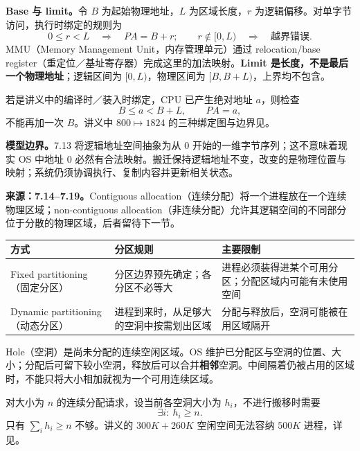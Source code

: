 \textbf{Base 与 limit。}令 $B$ 为起始物理地址，$L$ 为区域长度，$r$ 为逻辑偏移。对单字节访问，执行时绑定的规则为
\[
  0\le r<L\quad\Longrightarrow\quad PA=B+r;
  \qquad r\notin[0,L)\quad\Longrightarrow\quad\text{越界错误}.
\]
MMU（Memory Management Unit，内存管理单元）通过 relocation/base register（重定位／基址寄存器）完成这里的加法映射。\textbf{Limit 是长度，不是最后一个物理地址}；逻辑区间为 $[0,L)$，物理区间为 $[B,B+L)$，上界均不包含。

若是讲义中的编译时／装入时绑定，CPU 已产生绝对地址 $a$，则检查
\[
  B\le a<B+L,\qquad PA=a,
\]
不能再加一次 $B$。讲义中 $800\mapsto1824$ 的三种绑定图与边界见。

\textbf{模型边界。}7.13 将逻辑地址空间抽象为从 $0$ 开始的一维字节序列；这不意味着现实 OS 中地址 $0$ 必然有合法映射。搬迁保持逻辑地址不变，改变的是物理位置与映射；系统仍须协调执行、复制内容并更新相关状态。


\textbf{来源：7.14--7.19。}Contiguous allocation（连续分配）将一个进程放在一个连续物理区域；non-contiguous allocation（非连续分配）允许其逻辑空间的不同部分位于分散的物理区域，后者留待下一节。

\begin{center}
\begin{tabularx}{\textwidth}{@{}>{\raggedright\arraybackslash}p{3.2cm}>{\raggedright\arraybackslash}X>{\raggedright\arraybackslash}X@{}}
\toprule
方式 & 分区规则 & 主要限制 \\
\midrule
Fixed partitioning（固定分区） & 分区边界预先确定；各分区不必等大 & 进程必须装得进某个可用分区；分配区域内可能有未使用空间 \\
Dynamic partitioning（动态分区） & 进程到来时，从足够大的空洞中按需划出区域 & 分配与释放后，空洞可能被在用区域隔开 \\
\bottomrule
\end{tabularx}
\end{center}

Hole（空洞）是尚未分配的连续空闲区域。OS 维护已分配区与空洞的位置、大小；分配后可留下较小空洞，释放后可以合并\textbf{相邻}空洞。中间隔着仍被占用的区域时，不能只将大小相加就视为一个可用连续区域。

对大小为 $n$ 的连续分配请求，设当前各空洞大小为 $h_i$，不进行搬移时需要
\[
  \exists i:\ h_i\ge n.
\]
只有 $\sum_i h_i\ge n$ 不够。讲义的 $300K+260K$ 空闲空间无法容纳 $500K$ 进程，详见。

